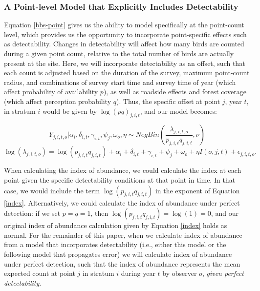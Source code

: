 \documentclass[12pt]{article}
\begin{document}
\subsubsection{A Point-level Model that Explicitly Includes Detectability}

\par Equation \ref{bbs-point} gives us the ability to model specifically at the point-count level, which provides us the opportunity to incorporate point-specific effects such as detectability.
Changes in detectability will affect how many birds are counted during a given point count, relative to the total number of birds are actually present at the site. 
Here, we will incorporate detectability as an offset, such that each count is adjusted based on the duration of the survey, maximum point-count radius, and combinations of survey start time and survey time of year (which affect probability of availability $p$), as well as roadside effects and forest coverage (which affect perception probability $q$). 
Thus, the specific offset at point $j$, year $t$, in stratum $i$ would be given by $\log(p q)_{j,i,t}$, and our model becomes:


\begin{equation*}
	Y_{j,i,t,o} | \alpha_i, \delta_{i,t}, \gamma_{i,t}, \psi_j, \omega_o, \eta \sim NegBin \left( \dfrac{\lambda_{j,i,t,o}}{p_{j,i,t}q_{j,i,t}}, \nu \right)
\end{equation*}
\begin{equation}\label{bbs-detect}
	\log(\lambda_{j,i,t,o}) = \log(p_{j,i,t}q_{j,i,t}) + \alpha_i + \delta_{i,t} + \gamma_{i,t} + \psi_j + \omega_o + \eta I(o,j,t) + \epsilon_{j,i,t,o}.
\end{equation}

\par When calculating the index of abundance, we could calculate the index at each point given the specific detectability conditions at that point in time.
In that case, we would include the term $\log(p_{j,i,t}q_{j,i,t})$ in the exponent of Equation \ref{index}.
Alternatively, we could calculate the index of abundance under perfect detection: if we set $p = q = 1$, then $\log(p_{j,i,t}q_{j,i,t}) = \log(1) = 0$, and our original index of abundance calculation given by Equation \ref{index} holds as normal.
For the remainder of this paper, when we calculate index of abundance from a model that incorporates detectability (i.e., either this model or the following model that propagates error) we will calculate index of abundance under perfect detection, such that the index of abundance represents the mean expected count at point $j$ in stratum $i$ during year $t$ by observer $o$, \textit{given perfect detectability}.
\end{document}
